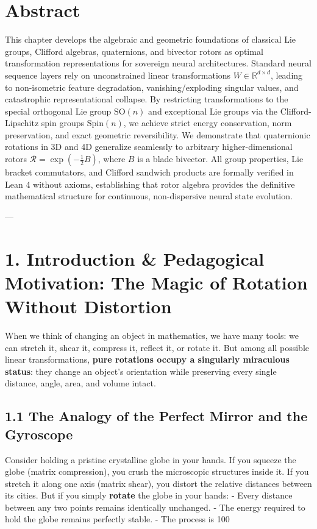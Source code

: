 \documentclass[11pt,twoside,openright]{amsbook}
\begin{document}
{{{{{{\section{Abstract}
This chapter develops the algebraic and geometric foundations of classical Lie groups, Clifford algebras, quaternions, and bivector rotors as optimal transformation representations for sovereign neural architectures. Standard neural sequence layers rely on unconstrained linear transformations $W \in \mathbb{R}^{d \times d}$, leading to non-isometric feature degradation, vanishing/exploding singular values, and catastrophic representational collapse. By restricting transformations to the special orthogonal Lie group $\mathrm{SO}(n)$ and exceptional Lie groups via the Clifford-Lipschitz spin groups $\mathrm{Spin}(n)$, we achieve strict energy conservation, norm preservation, and exact geometric reversibility. We demonstrate that quaternionic rotations in 3D and 4D generalize seamlessly to arbitrary higher-dimensional rotors $\mathcal{R} = \exp(-\frac{1}{2} B)$, where $B$ is a blade bivector. All group properties, Lie bracket commutators, and Clifford sandwich products are formally verified in Lean 4 without axioms, establishing that rotor algebra provides the definitive mathematical structure for continuous, non-dispersive neural state evolution.

---

\section{1. Introduction & Pedagogical Motivation: The Magic of Rotation Without Distortion}

When we think of changing an object in mathematics, we have many tools: we can stretch it, shear it, compress it, reflect it, or rotate it. But among all possible linear transformations, \textbf{pure rotations occupy a singularly miraculous status}: they change an object's orientation while preserving every single distance, angle, area, and volume intact.

\subsection{1.1 The Analogy of the Perfect Mirror and the Gyroscope}
Consider holding a pristine crystalline globe in your hands. If you squeeze the globe (matrix compression), you crush the microscopic structures inside it. If you stretch it along one axis (matrix shear), you distort the relative distances between its cities. But if you simply \textbf{rotate} the globe in your hands:
- Every distance between any two points remains identically unchanged.
- The energy required to hold the globe remains perfectly stable.
- The process is 100%

}}}}}}
\end{document}
